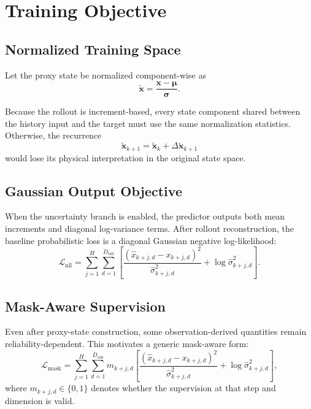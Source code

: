 \section{Training Objective}

\subsection{Normalized Training Space}

Let the proxy state be normalized component-wise as
\begin{equation}
\tilde{\mathbf{x}} = \frac{\mathbf{x} - \boldsymbol{\mu}}{\boldsymbol{\sigma}}.
\end{equation}

Because the rollout is increment-based, every state component shared between the history input and the target must use the same normalization statistics.
Otherwise, the recurrence
\begin{equation}
\tilde{\mathbf{x}}_{k+1} = \tilde{\mathbf{x}}_{k} + \Delta \tilde{\mathbf{x}}_{k+1}
\end{equation}
would lose its physical interpretation in the original state space.

\subsection{Gaussian Output Objective}

When the uncertainty branch is enabled, the predictor outputs both mean increments and diagonal log-variance terms.
After rollout reconstruction, the baseline probabilistic loss is a diagonal Gaussian negative log-likelihood:
\begin{equation}
\mathcal{L}_{\mathrm{nll}}
=
\sum_{j=1}^{H}
\sum_{d=1}^{D_{\mathrm{out}}}
\left[
\frac{\left(\hat{x}_{k+j,d} - x_{k+j,d}\right)^2}{\hat{\sigma}_{k+j,d}^{2}}
+
\log \hat{\sigma}_{k+j,d}^{2}
\right].
\end{equation}

\subsection{Mask-Aware Supervision}

Even after proxy-state construction, some observation-derived quantities remain reliability-dependent.
This motivates a generic mask-aware form:
\begin{equation}
\mathcal{L}_{\mathrm{mask}}
=
\sum_{j=1}^{H}
\sum_{d=1}^{D_{\mathrm{out}}}
m_{k+j,d}
\left[
\frac{\left(\hat{x}_{k+j,d} - x_{k+j,d}\right)^2}{\hat{\sigma}_{k+j,d}^{2}}
+
\log \hat{\sigma}_{k+j,d}^{2}
\right],
\end{equation}
where $m_{k+j,d} \in \{0,1\}$ denotes whether the supervision at that step and dimension is valid.

